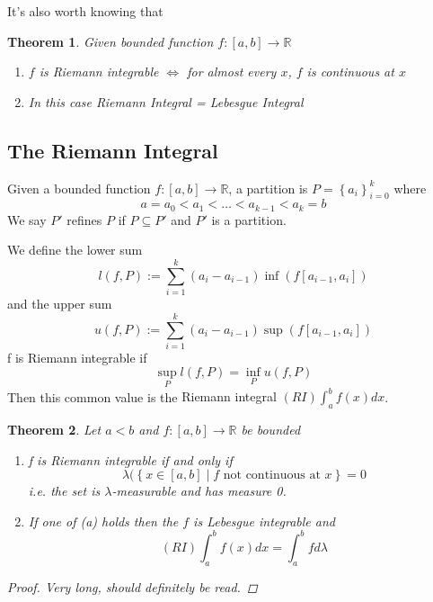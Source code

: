 \documentclass[11pt]{article}
\newcommand{\defeq}{:=}
\newcommand{\relmiddle}[1]{\mathrel{}\middle#1\mathrel{}}
\newcommand{\rmv}{\relmiddle|}
\newcommand{\R}{\mathbb{R}}
\newenvironment{defin}
	{\begin{mdframed}[backgroundcolor=white, roundcorner=5pt, linewidth=1pt]}
	{\end{mdframed}}
\newcommand{\mdf}[1]{{\color{red} #1}}
\newtheorem{theorem}{Theorem}[section]
\begin{document}
It's also worth knowing that
\begin{theorem}
Given bounded function $f:[a, b]\to\R$
\begin{enumerate}[label=(\alph*)]
	\item $f$ is Riemann integrable $\iff$ for almost every $x$, $f$ is continuous at $x$
	\item In this case Riemann Integral = Lebesgue Integral
\end{enumerate}
\end{theorem}

\subsection{The Riemann Integral}
\begin{defin}
	Given a bounded function $f:[a, b]\to\R$, a \mdf{partition} is $P=\left\{a_i\right\}_{i=0}^k$ where
	\[
		a=a_0 < a_1 < \dots < a_{k-1} < a_k = b
	\]
	We say $P'$ \mdf{refines} $P$ if $P\subseteq P'$ and $P'$ is a partition.

	We define the \mdf{lower sum}
	\[
		l(f,P)\defeq\sum_{i=1}^{k}(a_i-a_{i-1})\inf(f[a_{i-1}, a_i])
	\]
	and the \mdf{upper sum}
	\[
		u(f, P)\defeq\sum_{i=1}^{k}(a_i-a_{i-1})\sup(f[a_{i-1},a_i])
	\]
	f is \mdf{Riemann integrable} if
	\[
		\sup_P l(f, P) = \inf_P u(f, P)
	\]
	Then this common value is the \mdf{Riemann integral $(RI)\int_a^b f(x) dx$}.
\end{defin}
\begin{theorem}
Let $a < b$ and $f:[a, b]\to\R$ be bounded
\begin{enumerate}[label=(\alph*)]
	\item f is Riemann integrable if and only if
		\[
			\lambda(\left\{x\in[a, b] \rmv f\text{ not continuous at } x\right\}=0
		\]
		i.e. the set is $\lambda$-measurable and has measure 0.
	\item If one of \textit{(a)} holds then the $f$ is Lebesgue integrable and
		\[
			(RI)\int_a^b f(x) dx = \int_a^b f d\lambda
		\]
\end{enumerate}
\begin{proof}
Very long, should definitely be read.
\end{proof}
\end{theorem}
\end{document}
